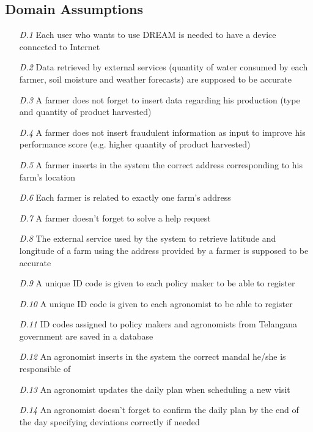 \subsection{Domain Assumptions}

\begin{itemize}
    \item [\textit{D.1}] Each user who wants to use DREAM is needed to have a device connected to Internet 
    \item [\textit{D.2}] Data retrieved by external services (quantity of water consumed by each farmer, soil moisture and weather forecasts) are supposed to be accurate 
    \item [\textit{D.3}] A farmer does not forget to insert data regarding his production (type and quantity of product harvested)
    \item [\textit{D.4}] A farmer does not insert fraudulent information as input to  improve his performance score (e.g. higher quantity of product harvested)
    \item [\textit{D.5}] A farmer inserts in the system the correct address
    corresponding to his farm's location
    \item [\textit{D.6}] Each farmer is related to exactly one farm's address
    \item [\textit{D.7}] A farmer doesn't forget to solve a help request
    \item [\textit{D.8}]The external service used by the system to retrieve latitude and longitude of a farm using the address provided by a farmer is supposed to be accurate
    \item [\textit{D.9}] A unique ID code is given to each policy maker to be able to register
    \item [\textit{D.10}] A unique ID code is given to each agronomist to be able to register
    \item [\textit{D.11}] ID codes assigned to policy makers and agronomists from Telangana government are saved in a database
    \item [\textit{D.12}] An agronomist inserts in the system the correct mandal he/she is responsible of
    \item [\textit{D.13}] An agronomist updates the daily plan when scheduling a new visit
    \item [\textit{D.14}] An agronomist doesn't forget to confirm the daily plan by the end of the day specifying deviations correctly if needed
\end{itemize}

